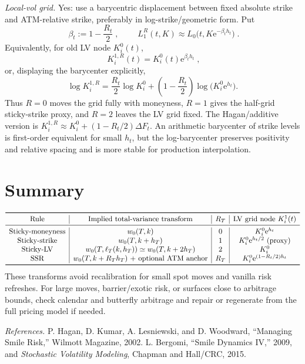 \documentclass[8pt]{extarticle}
\newcommand{\w}{w}
\newcommand{\e}{\mathrm{e}}
\begin{document}
\textit{Local-vol grid.} Yes: use a barycentric displacement between fixed absolute strike and ATM-relative strike, preferably in log-strike/geometric form. Put
\[
        \boxed{\;\beta_t:=1-\frac{R_t}{2}\;},
        \qquad
        \boxed{\;L_1^R(t,K)\approx L_0\bigl(t,K\e^{-\beta_t h_t}\bigr)\;} .
\]
Equivalently, for old LV node $K_i^0(t)$,
\[
        \boxed{\;K_i^{1,R}(t)=K_i^0(t)\e^{\beta_t h_t}\;},
\]
or, displaying the barycenter explicitly,
\[
        \log K_i^{1,R}
        =\frac{R_t}{2}\log K_i^0
        +\left(1-\frac{R_t}{2}\right)\log\bigl(K_i^0\e^{h_t}\bigr).
\]
Thus $R=0$ moves the grid fully with moneyness, $R=1$ gives the half-grid sticky-strike proxy, and $R=2$ leaves the LV grid fixed. The Hagan/additive version is $K_i^{1,R}\approx K_i^0+(1-R_t/2)\Delta F_t$. An arithmetic barycenter of strike levels is first-order equivalent for small $h_t$, but the log-barycenter preserves positivity and relative spacing and is more stable for production interpolation.

\section*{Summary}
\[
\begin{array}{c|c|c|c}
\toprule
\text{Rule} & \text{Implied total-variance transform} & R_T & \text{LV grid node }K_i^1(t) \\
\midrule
\text{Sticky-moneyness} & \w_0(T,k) & 0 & K_i^0\e^{h_t} \\
\text{Sticky-strike} & \w_0(T,k+h_T) & 1 & K_i^0\e^{h_t/2}\ \text{(proxy)} \\
\text{Sticky-LV} & \w_0(T,\ell_T(k,h_T))\simeq\w_0(T,k+2h_T) & 2 & K_i^0 \\
\text{SSR} & \w_0(T,k+R_T h_T)\ \text{+ optional ATM anchor} & R_T & K_i^0\e^{(1-R_t/2)h_t} \\
\bottomrule
\end{array}
\]
These transforms avoid recalibration for small spot moves and vanilla risk refreshes. For large moves, barrier/exotic risk, or surfaces close to arbitrage bounds, check calendar and butterfly arbitrage and repair or regenerate from the full pricing model if needed.

\vspace{1pt}
{\footnotesize\emph{References.} P. Hagan, D. Kumar, A. Lesniewski, and D. Woodward, ``Managing Smile Risk,'' Wilmott Magazine, 2002. L. Bergomi, ``Smile Dynamics IV,'' 2009, and \emph{Stochastic Volatility Modeling}, Chapman and Hall/CRC, 2015.}
\end{document}
